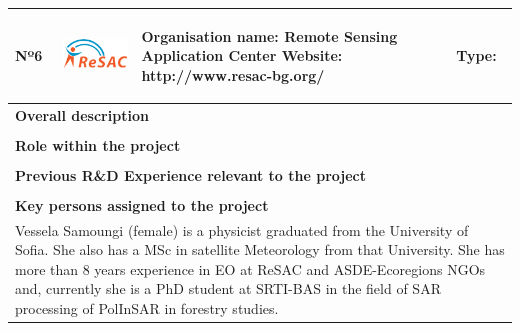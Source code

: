 \begin{longtable}[H]{|p{0.7cm}|p{4cm}|p{7cm}|p{1.3cm}|}
	\hline
	\begin{center} Nº6 \end{center} & \begin{center} \includegraphics[scale=1.2]{./logos/logo_resac} \end{center} & \begin{center} \textbf{Organisation name:} Remote Sensing Application Center \newline \textbf{Website:} http://www.resac-bg.org/ \end{center} & \begin{center} Type: \end{center} \\ \hline
	
	\multicolumn{4}{|p{13cm}|}{\textbf{Overall description}}  \\ \hline
	
	\multicolumn{4}{|p{14.5cm}|}{}  \\ \hline
	
	\multicolumn{4}{|p{13cm}|}{\textbf{Role within the project}}   \\ \hline
	
	\multicolumn{4}{|p{14.5cm}|}{}  \\ \hline
	
	\multicolumn{4}{|p{13cm}|}{\textbf{Previous R\&D Experience relevant to the project}}  \\ \hline
	
	\multicolumn{4}{|p{14.5cm}|}{}  \\ \hline
	
	\multicolumn{4}{|p{13cm}|}{\textbf{Key persons assigned to the project}}   \\ \hline
	
	\multicolumn{4}{|p{14.5cm}|}{Vessela Samoungi (female) is a physicist graduated from the University of Sofia. She also has a MSc in satellite Meteorology from that University. She has more than 8 years experience in EO at ReSAC and ASDE-Ecoregions NGOs and, currently she is a PhD student at SRTI-BAS in the field of SAR processing of PolInSAR in forestry studies.}  \\ \hline
	

\end{longtable}
